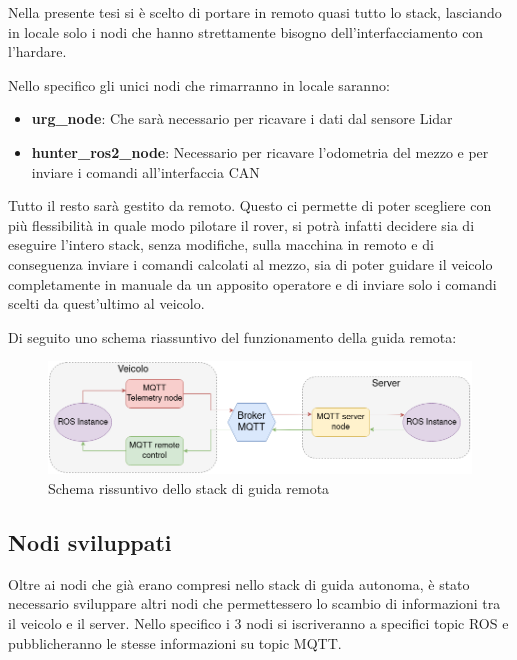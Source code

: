 \noindent Nella presente tesi si è scelto di portare in remoto quasi tutto lo stack, lasciando in locale solo i nodi che hanno strettamente bisogno dell'interfacciamento con l'hardare.

\noindent Nello specifico gli unici nodi che rimarranno in locale saranno:

\begin{itemize}
  \item \textbf{urg\_node}: Che sarà necessario per ricavare i dati dal sensore Lidar
  \item \textbf{hunter\_ros2\_node}: Necessario per ricavare l'odometria del mezzo e per inviare i comandi all'interfaccia CAN
\end{itemize}

\noindent Tutto il resto sarà gestito da remoto. Questo ci permette di poter scegliere con più flessibilità in quale modo pilotare il rover, si potrà infatti decidere sia di eseguire l'intero stack, senza modifiche, sulla macchina in remoto e di conseguenza inviare i comandi calcolati al mezzo, sia di poter guidare il veicolo completamente in manuale da un apposito operatore e di inviare solo i comandi scelti da quest'ultimo al veicolo.

\noindent Di seguito uno schema riassuntivo del funzionamento della guida remota:

\begin{figure}[h]
  \centering
  \includegraphics[width=1\textwidth]{figures/schema_guida_remota.png}
  \caption{Schema rissuntivo dello stack di guida remota}
  \label{Schema rissuntivo dello stack di guida remota}
\end{figure}

\subsection{Nodi sviluppati}
Oltre ai nodi che già erano compresi nello stack di guida autonoma, è stato necessario sviluppare altri nodi che permettessero lo scambio di informazioni tra il veicolo e il server. Nello specifico i 3 nodi si iscriveranno a specifici topic ROS e pubblicheranno le stesse informazioni su topic MQTT.

